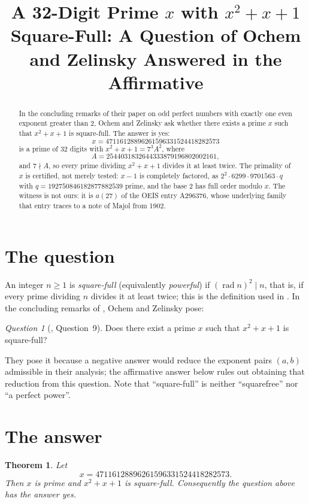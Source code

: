 \documentclass[11pt]{amsart}
\title[A 32-digit prime with $x^2+x+1$ square-full]
{A 32-Digit Prime $x$ with $x^2+x+1$ Square-Full:
 A Question of Ochem and Zelinsky Answered in the Affirmative}
\date{}
\newtheorem{theorem}{Theorem}
\theoremstyle{remark}
\newtheorem*{question}{Question}
\DeclareMathOperator{\rad}{rad}
\begin{document}
\begin{abstract}
In the concluding remarks of their paper on odd perfect numbers with exactly one
even exponent greater than $2$, Ochem and Zelinsky ask whether there exists a
prime $x$ such that $x^2+x+1$ is square-full. The answer is yes:
\[
 x=47116128896261596331524418282573
\]
is a prime of $32$ digits with $x^2+x+1=7^3A^2$, where
\[
 A=2544031832644333879196802002161,
\]
and $7\nmid A$, so every prime dividing $x^2+x+1$ divides it at least twice.
The primality of $x$ is certified, not merely tested: $x-1$ is completely
factored, as $2^2\cdot 6299\cdot 9701563\cdot q$ with
$q=192750846182877882539$ prime, and the base $2$ has full order modulo $x$.
The witness is not ours: it is $a(27)$ of the OEIS entry A296376, whose
underlying family that entry traces to a note of Majol from 1902.
\end{abstract}

\maketitle

\section{The question}

An integer $n\ge 1$ is \emph{square-full} (equivalently \emph{powerful}) if
$(\rad n)^2\mid n$, that is, if every prime dividing $n$ divides it at least
twice; this is the definition used in \cite{OZ}. In the concluding remarks of
\cite{OZ}, Ochem and Zelinsky pose:

\begin{question}[\cite{OZ}, Question~9]
Does there exist a prime $x$ such that $x^2+x+1$ is square-full?
\end{question}

\noindent
They pose it because a negative answer would reduce the exponent pairs $(a,b)$
admissible in their analysis; the affirmative answer below rules out obtaining
that reduction from this question. Note that ``square-full'' is neither
``squarefree'' nor ``a perfect power''.

\section{The answer}

\begin{theorem}\label{thm:main}
Let
\[
 x=47116128896261596331524418282573 .
\]
Then $x$ is prime and $x^2+x+1$ is square-full. Consequently the question above
has the answer \emph{yes}.
\end{theorem}
\end{document}
